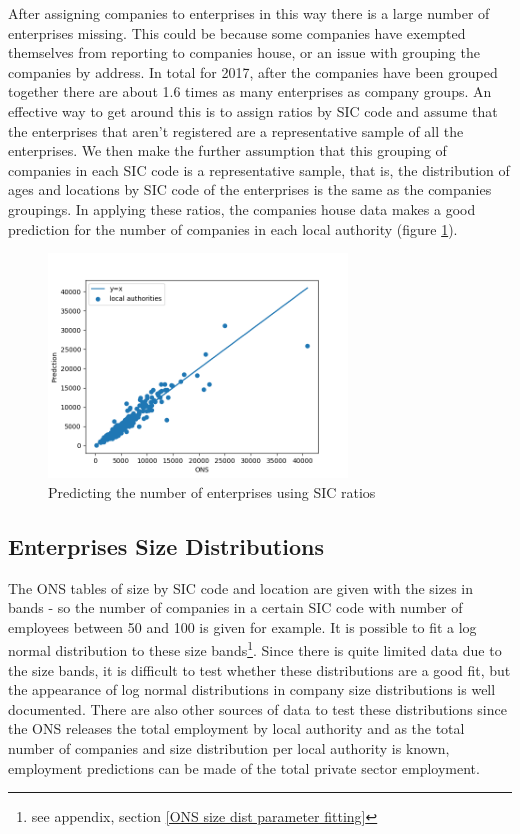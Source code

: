 \documentclass[a4paper,10pt]{article}
\begin{document}
After assigning companies to enterprises in this way there is a large number of enterprises missing. This could be because some companies have exempted themselves from reporting to companies house, or an issue with grouping the companies by address. In total for 2017, after the companies have been grouped together there are about 1.6 times as many enterprises as company groups. An effective way to get around this is to assign ratios by SIC code and assume that the enterprises that aren't registered are a representative sample of all the enterprises. We then make the further assumption that this grouping of companies in each SIC code is a representative sample, that is, the distribution of ages and locations by SIC code of the enterprises is the same as the companies groupings. In applying these ratios, the companies house data makes a good prediction for the number of companies in each local authority (figure \ref{predicting number of enterprises}).
\begin{figure}[!ht]
 \begin{center}
 \includegraphics[width=300px]{graphics/la_enterprise_predictions_with_ch}
 \end{center}
 \caption{Predicting the number of enterprises using SIC ratios}
 \label{predicting number of enterprises}
\end{figure}


\subsection{Enterprises Size Distributions}
\label{enterprise_sizes}
The ONS tables of size by SIC code and location are given with the sizes in bands - so the number of companies in a certain SIC code with number of employees between 50 and 100 is given for example. It is possible to fit a log normal distribution to these size bands\footnote{see appendix, section \ref{ONS size dist parameter fitting}}. Since there is quite limited data due to the size bands, it is difficult to test whether these distributions are a good fit, but the appearance of log normal distributions in company size distributions is well documented. There are also other sources of data to test these distributions since the ONS releases the total employment by local authority and as the total number of companies and size distribution per local authority is known, employment predictions can be made of the total private sector employment.
\end{document}
